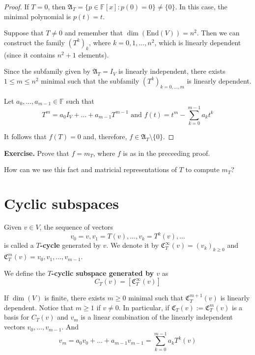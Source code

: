 \begin{proof}
	If $T = 0$, then $\mathfrak{A}_T = \{ p \in \mathbb{F}[x] : p(0) = 0 \} \neq \{ 0 \}$. In this case, the minimal polynomial is $p(t) = t$.
	
	Suppose that $T \neq 0$ and remember that $\dim(\text{End}(V)) = n^2$. Then we can construct the family $(T^k)_k$, where $k = 0, 1, \ldots, n^2$, which is linearly dependent (since it contains $n^2 + 1$ elements).
	
	Since the subfamily given by $\mathfrak{A}_T = I_V$ is linearly independent, there exists $1 \leq m \leq n^2$ minimal such that the subfamily $(T^k)_{k=0, \ldots, m}$ is linearly dependent.
	
	Let $a_0, \ldots, a_{m-1} \in \mathbb{F}$ such that
	\[
		T^m = a_0 I_V + \ldots + a_{m-1} T^{m-1} \text{ and } f(t) = t^m - \sum_{k=0}^{m-1} a_k t^k
	\]
	
	It follows that $f(T) = 0$ and, therefore, $f \in \mathfrak{A}_T \setminus \{ 0 \}$.
\end{proof}

\textbf{Exercise.} Prove that $f = m_T$, where $f$ is as in the preceeding proof.

How can we use this fact and matricial representations of $T$ to compute $m_T$?

\section{Cyclic subspaces}

\begin{definition}[$T$-cycle]
	Given $v \in V$, the sequence of vectors
	\[
		v_0 = v, v_1 = T(v), \ldots, v_k = T^k(v), \ldots
	\]
	is called a \textbf{$T$-cycle} generated by $v$. We denote it by $\mathfrak{C}_T^\infty (v) = (v_k)_{k \geq 0}$ and $\mathfrak{C}_T^m (v) = v_0, v_1, \ldots, v_{m-1}$.

	We define the \textbf{$T$-cyclic subspace generated by $v$} as
	\[
		C_T(v) = [\mathfrak{C}_T^\infty (v)]
	\]
\end{definition}

If $\dim(V)$ is finite, there exists $m \geq 0$ minimal such that $\mathfrak{C}_T^{m+1}(v)$ is linearly dependent. Notice that $m \geq 1$ if $v \neq 0$. In particular, if $\mathfrak{C}_T(v) := \mathfrak{C}_T^{m}(v)$ is a basis for $C_T(v)$ and $v_m$ is a linear combination of the linearly independent vectors $v_0, \ldots, v_{m-1}$. And
\[
	v_m = a_0 v_0 + \ldots + a_{m-1} v_{m-1} = \sum_{k=0}^{m-1} a_k T^k(v)
\]

